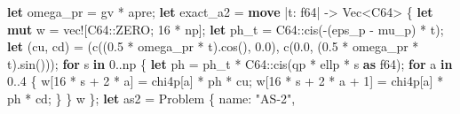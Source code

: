 \documentclass[
  10pt,
]{article}
\newenvironment{Shaded}{}{}
\newcommand{\ControlFlowTok}[1]{\textcolor[rgb]{0.00,0.44,0.13}{\textbf{#1}}}
\newcommand{\DataTypeTok}[1]{\textcolor[rgb]{0.56,0.13,0.00}{#1}}
\newcommand{\DecValTok}[1]{\textcolor[rgb]{0.25,0.63,0.44}{#1}}
\newcommand{\KeywordTok}[1]{\textcolor[rgb]{0.00,0.44,0.13}{\textbf{#1}}}
\newcommand{\NormalTok}[1]{#1}
\newcommand{\OperatorTok}[1]{\textcolor[rgb]{0.40,0.40,0.40}{#1}}
\newcommand{\PreprocessorTok}[1]{\textcolor[rgb]{0.74,0.48,0.00}{#1}}
\newcommand{\StringTok}[1]{\textcolor[rgb]{0.25,0.44,0.63}{#1}}
\begin{document}
\begin{Shaded}
\begin{Highlighting}[]
    \KeywordTok{let}\NormalTok{ omega\_pr }\OperatorTok{=}\NormalTok{ gv }\OperatorTok{*}\NormalTok{ apre}\OperatorTok{;}
    \KeywordTok{let}\NormalTok{ exact\_a2 }\OperatorTok{=} \KeywordTok{move} \OperatorTok{|}\NormalTok{t}\OperatorTok{:} \DataTypeTok{f64}\OperatorTok{|} \OperatorTok{{-}\textgreater{}} \DataTypeTok{Vec}\OperatorTok{\textless{}}\NormalTok{C64}\OperatorTok{\textgreater{}} \OperatorTok{\{}
        \KeywordTok{let} \KeywordTok{mut}\NormalTok{ w }\OperatorTok{=} \PreprocessorTok{vec!}\NormalTok{[}\PreprocessorTok{C64::}\NormalTok{ZERO}\OperatorTok{;} \DecValTok{16} \OperatorTok{*}\NormalTok{ np]}\OperatorTok{;}
        \KeywordTok{let}\NormalTok{ ph\_t }\OperatorTok{=} \PreprocessorTok{C64::}\NormalTok{cis(}\OperatorTok{{-}}\NormalTok{(eps\_p }\OperatorTok{{-}}\NormalTok{ mu\_p) }\OperatorTok{*}\NormalTok{ t)}\OperatorTok{;}
        \KeywordTok{let}\NormalTok{ (cu}\OperatorTok{,}\NormalTok{ cd) }\OperatorTok{=}\NormalTok{ (c((}\DecValTok{0.5} \OperatorTok{*}\NormalTok{ omega\_pr }\OperatorTok{*}\NormalTok{ t)}\OperatorTok{.}\NormalTok{cos()}\OperatorTok{,} \DecValTok{0.0}\NormalTok{)}\OperatorTok{,}\NormalTok{ c(}\DecValTok{0.0}\OperatorTok{,}\NormalTok{ (}\DecValTok{0.5} \OperatorTok{*}\NormalTok{ omega\_pr }\OperatorTok{*}\NormalTok{ t)}\OperatorTok{.}\NormalTok{sin()))}\OperatorTok{;}
        \ControlFlowTok{for}\NormalTok{ s }\KeywordTok{in} \DecValTok{0}\OperatorTok{..}\NormalTok{np }\OperatorTok{\{}
            \KeywordTok{let}\NormalTok{ ph }\OperatorTok{=}\NormalTok{ ph\_t }\OperatorTok{*} \PreprocessorTok{C64::}\NormalTok{cis(qp }\OperatorTok{*}\NormalTok{ ellp }\OperatorTok{*}\NormalTok{ s }\KeywordTok{as} \DataTypeTok{f64}\NormalTok{)}\OperatorTok{;}
            \ControlFlowTok{for}\NormalTok{ a }\KeywordTok{in} \DecValTok{0}\OperatorTok{..}\DecValTok{4} \OperatorTok{\{}
\NormalTok{                w[}\DecValTok{16} \OperatorTok{*}\NormalTok{ s }\OperatorTok{+} \DecValTok{2} \OperatorTok{*}\NormalTok{ a] }\OperatorTok{=}\NormalTok{ chi4p[a] }\OperatorTok{*}\NormalTok{ ph }\OperatorTok{*}\NormalTok{ cu}\OperatorTok{;}
\NormalTok{                w[}\DecValTok{16} \OperatorTok{*}\NormalTok{ s }\OperatorTok{+} \DecValTok{2} \OperatorTok{*}\NormalTok{ a }\OperatorTok{+} \DecValTok{1}\NormalTok{] }\OperatorTok{=}\NormalTok{ chi4p[a] }\OperatorTok{*}\NormalTok{ ph }\OperatorTok{*}\NormalTok{ cd}\OperatorTok{;}
            \OperatorTok{\}}
        \OperatorTok{\}}
\NormalTok{        w}
    \OperatorTok{\};}
    \KeywordTok{let}\NormalTok{ as2 }\OperatorTok{=}\NormalTok{ Problem }\OperatorTok{\{}
\NormalTok{        name}\OperatorTok{:} \StringTok{"AS{-}2"}\OperatorTok{,}

\end{Highlighting}
\end{Shaded}
\end{document}
